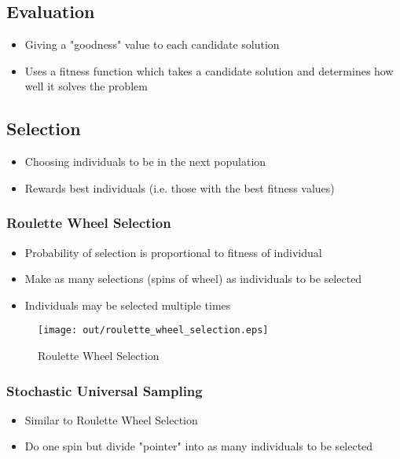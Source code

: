 \documentclass[a4paper]{article}
\begin{document}
\subsection{Evaluation}

\begin{itemize}
  \item Giving a "goodness" value to each candidate solution
  \item Uses a fitness function which takes a candidate solution and determines
        how well it solves the problem
\end{itemize}

\subsection{Selection}

\begin{itemize}
  \item Choosing individuals to be in the next population
  \item Rewards best individuals (i.e. those with the best fitness values)
\end{itemize}

\subsubsection{Roulette Wheel Selection}

\begin{itemize}
  \item Probability of selection is proportional to fitness of individual
  \item Make as many selections (spins of wheel) as individuals to be selected
  \item Individuals may be selected multiple times
\end{itemize}

\begin{figure}[h!]
  \centering
  \texttt{[image: out/roulette\_wheel\_selection.eps]}
  \caption{Roulette Wheel Selection}
  \label{fig:roulette_wheel_selection}
\end{figure}
\FloatBarrier

\subsubsection{Stochastic Universal Sampling}

\begin{itemize}
  \item Similar to Roulette Wheel Selection
  \item Do one spin but divide "pointer" into as many individuals to be selected
\end{itemize}
\end{document}
